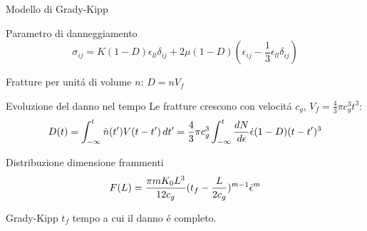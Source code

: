 \begin{frame}{Modello di Grady-Kipp}
\begin{block}{Parametro di danneggiamento}
\begin{equation*}
\sigma_{ij}=K(1-D)\epsilon_{ll}\delta_{ij}+2\mu(1-D)(\epsilon_{ij}-\frac{1}{3}\epsilon_{ll}\delta_{ij})
\end{equation*}
\end{block}
\begin{block}{Fratture per unit\'a di volume $n$: $D=nV_f$}
\end{block}
\begin{block}{Evoluzione del danno nel tempo}
Le fratture crescono con velocit\'a $c_g$, $V_f=\frac{4}{3}\pi c_g^3t^3$:
\begin{equation*}D(t)=\int_{-\infty}^t\dot{n}(t')V(t-t')\,dt'=\frac{4}{3}\pi c_g^3\int_{-\infty}^t\frac{d N}{d \epsilon}\dot{\epsilon}(1-D)(t-t')^3\end{equation*}
\end{block}
\begin{block}{Distribuzione dimensione frammenti}
\begin{equation*}
F(L)=\frac{\pi mK_0L^3}{12c_g}(t_f-\frac{L}{2c_g})^{m-1}\dot{\epsilon}^m
\end{equation*}
\end{block}
\end{frame}

\begin{wordonframe}{Grady-Kipp}
$t_f$ tempo a cui il danno \'e completo.
\end{wordonframe}

